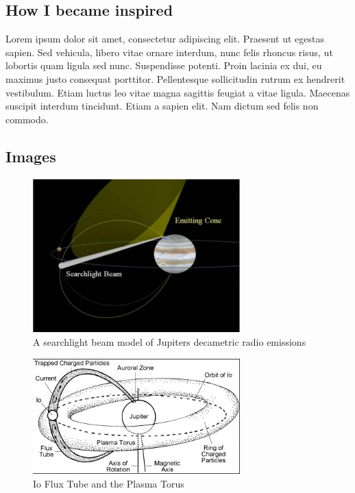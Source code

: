 \documentclass[runningheads,a4paper]{llncs}
\begin{document}
\begin{subappendices}
\subsection*{How I became inspired}
Lorem ipsum dolor sit amet, consectetur adipiscing elit. Praesent ut egestas sapien. Sed vehicula, libero vitae ornare interdum, nunc felis rhoncus risus, ut lobortis quam ligula sed nunc. Suspendisse potenti. Proin lacinia ex dui, eu maximus justo consequat porttitor. Pellentesque sollicitudin rutrum ex hendrerit vestibulum. Etiam luctus leo vitae magna sagittis feugiat a vitae ligula. Maecenas suscipit interdum tincidunt. Etiam a sapien elit. Nam dictum sed felis non commodo.

\subsection*{Images}

%
\begin{figure}[here]
\centering
\includegraphics[width=8cm]{images/12}
\caption{A searchlight beam model of Jupiters decametric radio emissions \citep{imai-08}}
\label{fig:decametric_emissions_searchlight}
\end{figure}
%

%
\begin{figure}[here]
\centering
\includegraphics[width=8cm]{images/13}
\caption{Io Flux Tube and the Plasma Torus \citep{lang-10}}
\label{fig:io_flux_tube_plasma_torus}
\end{figure}
%


\end{subappendices}
\end{document}
